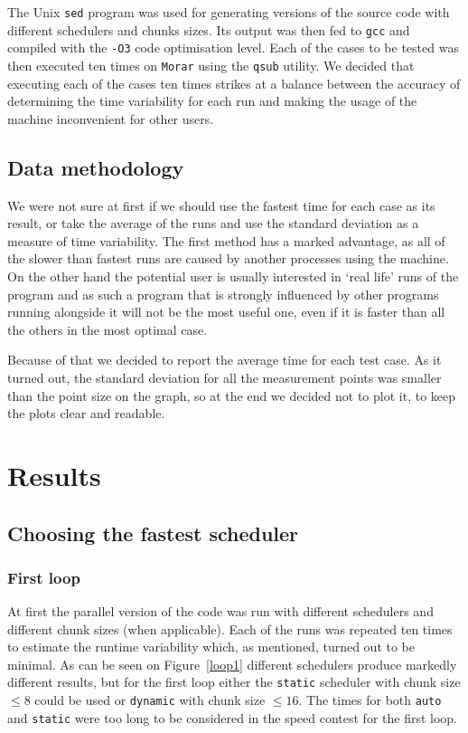 \documentclass[11pt,a4paper]{article}
\begin{document}
The Unix \texttt{sed} program was used for generating versions of the source code with different schedulers and chunks sizes. Its output was then fed to \texttt{gcc} and compiled with the \texttt{-O3} code optimisation level. Each of the cases to be tested was then executed ten times on \texttt{Morar} using the \texttt{qsub} utility. We decided that executing each of the cases ten times strikes at a balance between the accuracy of determining the time variability for each run and making the usage of the machine inconvenient for other users.

\subsection{Data methodology}
We were not sure at first if we should use the fastest time for each case as its result, or take the average of the runs and use the standard deviation as a measure of time variability. The first method has a marked advantage, as all of the slower than fastest runs are caused by another processes using the machine. On the other hand the potential user is usually interested in `real life' runs of the program and as such a program that is strongly influenced by other programs running alongside it will not be the most useful one, even if it is faster than all the others in the most optimal case. 

Because of that we decided to report the average time for each test case. As it turned out, the standard deviation for all the measurement points was smaller than the point size on the graph, so at the end we decided not to plot it, to keep the plots clear and readable.

\section{Results}
\subsection{Choosing the fastest scheduler}
\subsubsection{First loop}
At first the parallel version of the code was run with different schedulers and different chunk sizes (when applicable). Each of the runs was repeated ten times to estimate the runtime variability which, as mentioned, turned out to be minimal. As can be seen on Figure~\ref{loop1} different schedulers produce markedly different results, but for the first loop either the \texttt{static} scheduler with chunk size \(\leq 8\) could be used or \texttt{dynamic} with chunk size \(\leq 16\). The times for both \texttt{auto} and \texttt{static} were too long to be considered in the speed contest for the first loop.
\end{document}
